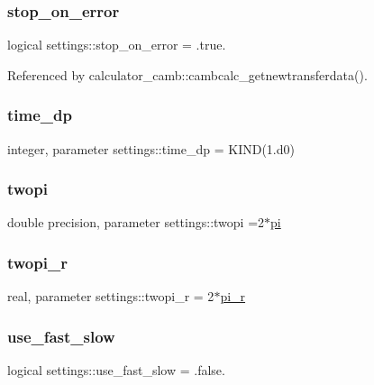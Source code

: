\subsubsection{\texorpdfstring{stop\+\_\+on\+\_\+error}{stop\_on\_error}}
{\footnotesize\ttfamily logical settings\+::stop\+\_\+on\+\_\+error = .true.}



Referenced by calculator\+\_\+camb\+::cambcalc\+\_\+getnewtransferdata().

\mbox{\label{namespacesettings_a3d81f31b9e0eef8de19fb9b016043af7}} 
\subsubsection{\texorpdfstring{time\+\_\+dp}{time\_dp}}
{\footnotesize\ttfamily integer, parameter settings\+::time\+\_\+dp = K\+I\+ND(1.d0)}

\mbox{\label{namespacesettings_a22fb9d779d16c940a845d5da795ef6ec}} 
\subsubsection{\texorpdfstring{twopi}{twopi}}
{\footnotesize\ttfamily double precision, parameter settings\+::twopi =2$\ast$\mbox{\hyperlink{namespacesettings_a57710b73441b5ec0babcaa48cd333055}{pi}}}

\mbox{\label{namespacesettings_a87b6f8cb970e358fc23b950e8db62257}} 
\subsubsection{\texorpdfstring{twopi\+\_\+r}{twopi\_r}}
{\footnotesize\ttfamily real, parameter settings\+::twopi\+\_\+r = 2$\ast$\mbox{\hyperlink{namespacesettings_a6fe3b2dcac06d9e51592e885f64ace1d}{pi\+\_\+r}}}

\mbox{\label{namespacesettings_ae20cda2e95f0e537dcbca3b63cb9bb0f}} 
\subsubsection{\texorpdfstring{use\+\_\+fast\+\_\+slow}{use\_fast\_slow}}
{\footnotesize\ttfamily logical settings\+::use\+\_\+fast\+\_\+slow = .false.}

